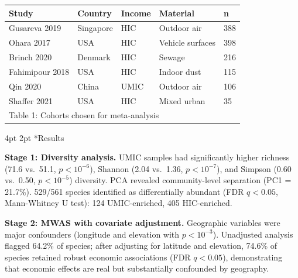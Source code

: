 \documentclass[12pt,a4paper]{article}
\makeatletter
\renewcommand\section{\@startsection{section}{1}{\z@}%
  {4pt \@plus 1pt \@minus 1pt}{2pt}%
  {\normalfont\normalsize\bfseries}}
\makeatother
\begin{document}
\begin{table}[h!]
\centering
\small
\setlength{\tabcolsep}{5pt}
\begin{tabular}{lllll}
\hline
\textbf{Study} & \textbf{Country} & \textbf{Income} & \textbf{Material} & \textbf{n} \\
\hline
Gusareva 2019 & Singapore & HIC & Outdoor air & 388 \\
Ohara 2017 & USA & HIC & Vehicle surfaces & 398 \\
Brinch 2020 & Denmark & HIC & Sewage & 216 \\
Fahimipour 2018 & USA & HIC & Indoor dust & 115 \\
Qin 2020 & China & UMIC & Outdoor air & 106 \\
Shaffer 2021 & USA & HIC & Mixed urban & 35 \\
\hline
\multicolumn{5}{l}{\small Table 1: Cohorts chosen for meta-analysis}
\end{tabular}
\end{table}

\section*{Results}

\textbf{Stage 1: Diversity analysis.}
UMIC samples had significantly higher richness (71.6 vs.\ 51.1, $p<10^{-6}$), Shannon (2.04 vs.\ 1.36, $p<10^{-7}$), and Simpson (0.60 vs.\ 0.50, $p<10^{-5}$) diversity.
PCA revealed community-level separation (PC1 = 21.7\%).
529/561 species identified as differentially abundant (FDR $q<0.05$, Mann-Whitney U test): 124 UMIC-enriched, 405 HIC-enriched.

\textbf{Stage 2: MWAS with covariate adjustment.}
Geographic variables were major confounders (longitude and elevation with $p<10^{-3}$).
Unadjusted analysis flagged 64.2\% of species; after adjusting for latitude and elevation, 74.6\% of species retained robust economic associations (FDR $q<0.05$),
demonstrating that economic effects are real but substantially confounded by geography.
\end{document}
